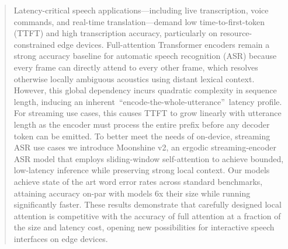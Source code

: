\documentclass[nohyperref]{article}
\begin{document}

\printAffiliationsAndNotice{}

\begin{abstract}
Latency-critical speech applications—including live transcription, voice
commands, and real-time translation—demand low time-to-first-token (TTFT) and
high transcription accuracy, particularly on resource-constrained edge devices.
Full-attention Transformer encoders remain a strong accuracy baseline for
automatic speech recognition (ASR) because every frame can directly attend to
every other frame, which resolves otherwise locally ambiguous acoustics using
distant lexical context. However, this global dependency incurs quadratic
complexity in sequence length, inducing an inherent
\,``encode-the-whole-utterance''\, latency profile. For streaming use cases,
this causes TTFT to grow linearly with utterance length as the encoder must
process the entire prefix before any decoder token can be emitted. To better
meet the needs of on-device, streaming ASR use cases we introduce Moonshine v2,
an ergodic streaming-encoder ASR model that employs sliding-window
self-attention to achieve bounded, low-latency inference while preserving strong
local context. Our models achieve state of the art word error rates across
standard benchmarks, attaining accuracy on-par with models 6x their size while
running significantly faster. These results demonstrate that carefully designed local
attention is competitive with the accuracy of full attention at a fraction of
the size and latency cost, opening new possibilities for interactive speech
interfaces on edge devices.
\end{abstract}













\end{document}
